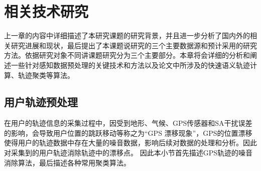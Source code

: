 \chapter{相关技术研究}
\label{chap:chapter02}
上一章的内容中详细描述了本研究课题的研究背景，并且进一步分析了国内外的相关研究进展和现状，最后提出了本课题说研究的三个主要数据源和预计采用的研究方法。依据研究对象不同讲课题研究分为三个主要部分。本章将会详细的分析和阐述一些针对感知数据预处理的关键技术和方法以及论文中所涉及的快速语义轨迹计算、轨迹聚类等算法。
\section{用户轨迹预处理}
\label{sec:section2-1}
在用户的轨迹信息的采集过程中，因受到地形、气候、GPS传感器和SA干扰误差的影响，会导致用户位置的跳跃移动等称之为“GPS 漂移现象”，GPS的位置漂移使得用户的轨迹数据中存在大量的噪音数据，影响后续对数据的处理和分析。因此对采集到的用户轨迹消除轨迹中的漂移点。%
因此本小节首先描述GPS轨迹的噪音消除算法，最后描述各种常用聚类算法。
